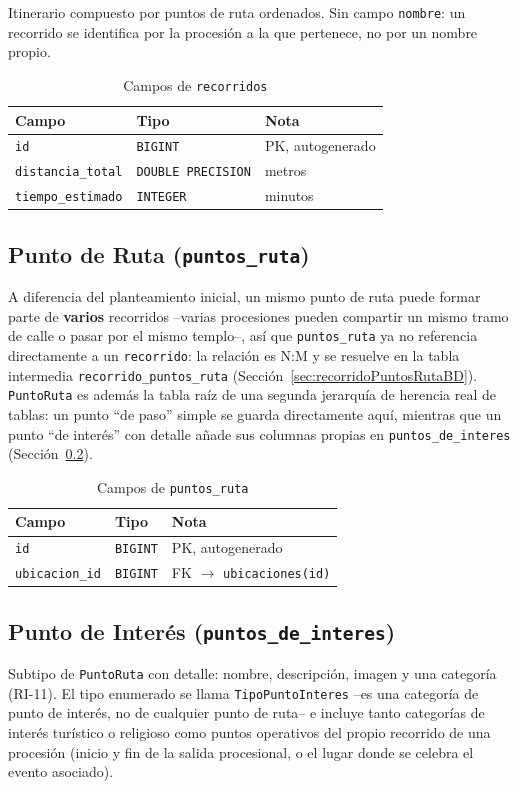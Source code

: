 Itinerario compuesto por puntos de ruta ordenados. Sin campo \texttt{nombre}: un recorrido se identifica por la procesión a la que pertenece, no por un nombre propio.

\begin{table}[H]
\centering
\begin{tabular}{|l|l|p{7cm}|}
\hline
\textbf{Campo} & \textbf{Tipo} & \textbf{Nota} \\
\hline
\texttt{id} & \texttt{BIGINT} & PK, autogenerado \\
\hline
\texttt{distancia\_total} & \texttt{DOUBLE PRECISION} & metros \\
\hline
\texttt{tiempo\_estimado} & \texttt{INTEGER} & minutos \\
\hline
\end{tabular}
\caption{Campos de \texttt{recorridos}}
\end{table}

\subsection{Punto de Ruta (\texttt{puntos\_ruta})}
A diferencia del planteamiento inicial, un mismo punto de ruta puede formar parte de \textbf{varios} recorridos --varias procesiones pueden compartir un mismo tramo de calle o pasar por el mismo templo--, así que \texttt{puntos\_ruta} ya no referencia directamente a un \texttt{recorrido}: la relación es N:M y se resuelve en la tabla intermedia \texttt{recorrido\_puntos\_ruta} (Sección~\ref{sec:recorridoPuntosRutaBD}). \texttt{PuntoRuta} es además la tabla raíz de una segunda jerarquía de herencia real de tablas: un punto ``de paso'' simple se guarda directamente aquí, mientras que un punto ``de interés'' con detalle añade sus columnas propias en \texttt{puntos\_de\_interes} (Sección~\ref{sec:puntosDeInteresBD}).

\begin{table}[H]
\centering
\begin{tabular}{|l|l|p{7cm}|}
\hline
\textbf{Campo} & \textbf{Tipo} & \textbf{Nota} \\
\hline
\texttt{id} & \texttt{BIGINT} & PK, autogenerado \\
\hline
\texttt{ubicacion\_id} & \texttt{BIGINT} & FK $\to$ \texttt{ubicaciones(id)} \\
\hline
\end{tabular}
\caption{Campos de \texttt{puntos\_ruta}}
\end{table}

\subsection{Punto de Interés (\texttt{puntos\_de\_interes})}\label{sec:puntosDeInteresBD}
Subtipo de \texttt{PuntoRuta} con detalle: nombre, descripción, imagen y una categoría (RI-11). El tipo enumerado se llama \texttt{TipoPuntoInteres} --es una categoría de punto de interés, no de cualquier punto de ruta-- e incluye tanto categorías de interés turístico o religioso como puntos operativos del propio recorrido de una procesión (inicio y fin de la salida procesional, o el lugar donde se celebra el evento asociado).

